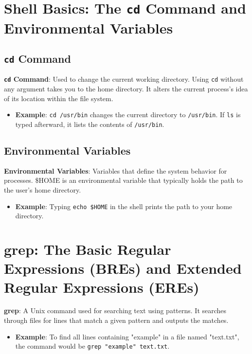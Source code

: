 \documentclass{article}
\begin{document}
\section{Shell Basics: The \texttt{cd} Command and Environmental Variables}

\subsection{\texttt{cd} Command}

\textbf{\texttt{cd} Command}: Used to change the current working directory. Using \texttt{cd} without any argument takes you to the home directory. It alters the current process's idea of its location within the file system.

\begin{itemize}
    \item \textbf{Example}: \texttt{cd /usr/bin} changes the current directory to \texttt{/usr/bin}. If \texttt{ls} is typed afterward, it lists the contents of \texttt{/usr/bin}.
\end{itemize}

\subsection{Environmental Variables}

\textbf{Environmental Variables}: Variables that define the system behavior for processes. \$HOME is an environmental variable that typically holds the path to the user's home directory.

\begin{itemize}
    \item \textbf{Example}: Typing \texttt{echo \$HOME} in the shell prints the path to your home directory.
\end{itemize}

\section{grep: The Basic Regular Expressions (BREs) and Extended Regular Expressions (EREs)}

\textbf{grep}: A Unix command used for searching text using patterns. It searches through files for lines that match a given pattern and outputs the matches.

\begin{itemize}
    \item \textbf{Example}: To find all lines containing "example" in a file named "text.txt", the command would be \texttt{grep "example" text.txt}.
\end{itemize}
\end{document}
